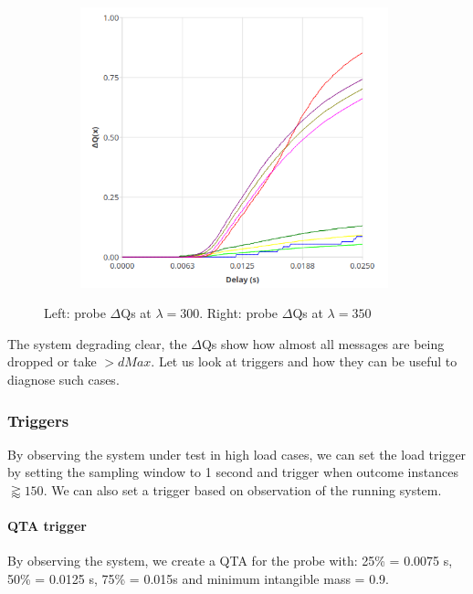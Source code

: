 \begin{figure}[H]
\begin{subfigure}{.5\textwidth}
                \includegraphics[width =0.98\textwidth]{img/overload_2/350_probe.png}
                \label{fig:high_load_2}
            \end{subfigure}
            \label{fig:early_ov}
            \caption{Left: probe $\Delta$Qs at $\lambda = 300$. Right: probe $\Delta$Qs at $\lambda = 350$}
        \end{figure}

    The system degrading clear, the $\Delta$Qs show how almost all messages are being dropped or take $> dMax$. Let us look at triggers and how they can be useful to diagnose such cases.
  
    \subsubsection{Triggers}
        By observing the system under test in high load cases, we can set the load trigger by setting the sampling window to 1 second and trigger when outcome instances $\gtrapprox 150$. We can also set a trigger based on observation of the running system.

        \paragraph{QTA trigger}
            By observing the system, we create a QTA for the probe with: 25\% = 0.0075 s, 50\% = 0.0125 s, 75\% = 0.015s and minimum intangible mass = 0.9.

